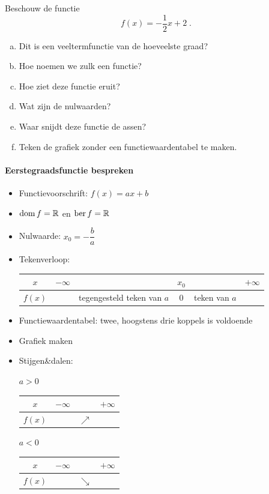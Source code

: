 \documentclass[12pt]{article}
\begin{document}
\begin{oefening}
  Beschouw de functie
  $$f(x)=-\dfrac{1}{2}x+2\;.$$
  \begin{enumerate}[(a)]
  \item Dit is een veeltermfunctie van de hoeveelste graad?
  \item Hoe noemen we zulk een functie?
  \item Hoe ziet deze functie eruit?
  \item Wat zijn de nulwaarden?
  \item Waar snijdt deze functie de assen?
  \item Teken de grafiek zonder een functiewaardentabel te maken.
  \end{enumerate}
\end{oefening}

\paragraph*{Eerstegraadsfunctie bespreken}
\begin{mdframed}
  \begin{itemize}
  \item Functievoorschrift: $f(x)=ax + b$
  \item $\dom f = \mathbb{R}$ en $\ber f = \mathbb{R}$
  \item Nulwaarde: $x_0=-\dfrac{b}{a}$
  \item Tekenverloop:
    \begin{center}
      \begin{tabular}{c|lp{2.5cm}cp{1.5cm}r}
        $x$ & $-\infty$ & & $x_0$ & & $+\infty$\\
        \hline
        $f(x)$ & & tegengesteld teken van $a$ & 0 & teken van $a$ &
      \end{tabular}
    \end{center}
  \item Functiewaardentabel: twee, hoogstens drie koppels is voldoende
  \item Grafiek maken
  \item Stijgen\&dalen:\\
    \begin{minipage}{0.45\textwidth}
      \centering $a>0$\\
      \begin{tabular}{c|lcr}
        $x$ & $-\infty$ & & $+\infty$\\
        \hline
        $f(x)$ & & $\nearrow$ &
      \end{tabular}
    \end{minipage}
    \begin{minipage}{0.45\textwidth}
      \centering $a<0$\\
      \begin{tabular}{c|lcr}
        $x$ & $-\infty$ & & $+\infty$\\
        \hline
        $f(x)$ & & $\searrow$ &
      \end{tabular}
    \end{minipage}
  \end{itemize}
\end{mdframed}
\end{document}
